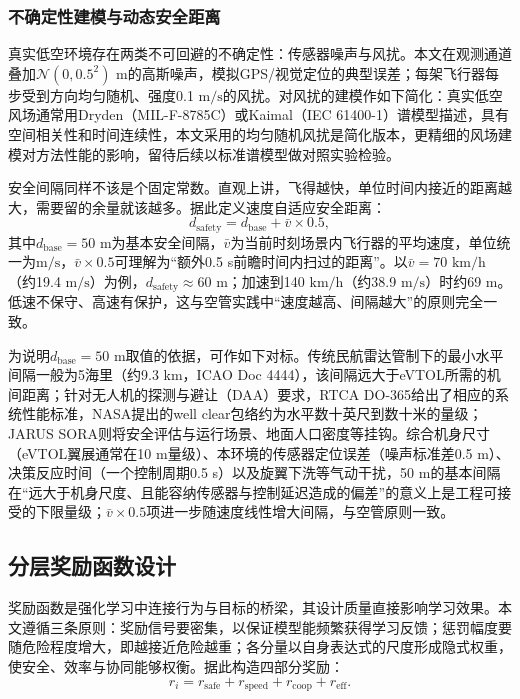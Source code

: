\documentclass[12pt,a4paper,UTF8]{ctexart}
\begin{document}
\subsubsection{不确定性建模与动态安全距离}

真实低空环境存在两类不可回避的不确定性：传感器噪声与风扰。本文在观测通道叠加$\mathcal{N}(0, 0.5^2)$ m的高斯噪声，模拟GPS/视觉定位的典型误差；每架飞行器每步受到方向均匀随机、强度0.1 $\mathrm{m/s}$的风扰。对风扰的建模作如下简化：真实低空风场通常用Dryden（MIL-F-8785C）\cite{ref26}或Kaimal（IEC 61400-1）\cite{ref44}谱模型描述，具有空间相关性和时间连续性，本文采用的均匀随机风扰是简化版本，更精细的风场建模对方法性能的影响，留待后续以标准谱模型做对照实验检验。

安全间隔同样不该是个固定常数。直观上讲，飞得越快，单位时间内接近的距离越大，需要留的余量就该越多。据此定义速度自适应安全距离：
\begin{equation}
    d_{\text{safety}} = d_{\text{base}} + \bar{v} \times 0.5,
    \label{eq:safety_distance}
\end{equation}
其中$d_{\text{base}}=50$ m为基本安全间隔，$\bar{v}$为当前时刻场景内飞行器的平均速度，单位统一为$\mathrm{m/s}$，$\bar{v}\times0.5$可理解为“额外0.5 s前瞻时间内扫过的距离”。以$\bar{v}=70$ $\mathrm{km/h}$（约19.4 $\mathrm{m/s}$）为例，$d_{\text{safety}}\approx60$ m；加速到140 $\mathrm{km/h}$（约38.9 $\mathrm{m/s}$）时约69 m。低速不保守、高速有保护，这与空管实践中“速度越高、间隔越大”的原则完全一致。

为说明$d_{\text{base}}=50$ m取值的依据，可作如下对标。传统民航雷达管制下的最小水平间隔一般为5海里（约9.3 km，ICAO Doc 4444）\cite{ref49}，该间隔远大于eVTOL所需的机间距离；针对无人机的探测与避让（DAA）要求，RTCA DO-365给出了相应的系统性能标准\cite{ref51}，NASA提出的well clear包络约为水平数十英尺到数十米的量级；JARUS SORA则将安全评估与运行场景、地面人口密度等挂钩\cite{ref50}。综合机身尺寸（eVTOL翼展通常在10 m量级）、本环境的传感器定位误差（噪声标准差0.5 m）、决策反应时间（一个控制周期0.5 s）以及旋翼下洗等气动干扰，50 m的基本间隔在“远大于机身尺度、且能容纳传感器与控制延迟造成的偏差”的意义上是工程可接受的下限量级；$\bar{v}\times0.5$项进一步随速度线性增大间隔，与空管原则一致。

\subsection{分层奖励函数设计}

奖励函数是强化学习中连接行为与目标的桥梁，其设计质量直接影响学习效果。本文遵循三条原则：奖励信号要密集，以保证模型能频繁获得学习反馈；惩罚幅度要随危险程度增大，即越接近危险越重；各分量以自身表达式的尺度形成隐式权重，使安全、效率与协同能够权衡。据此构造四部分奖励：
\begin{equation}
    r_i = r_{\text{safe}} + r_{\text{speed}} + r_{\text{coop}} + r_{\text{eff}}.
    \label{eq:reward_total}
\end{equation}
\end{document}
